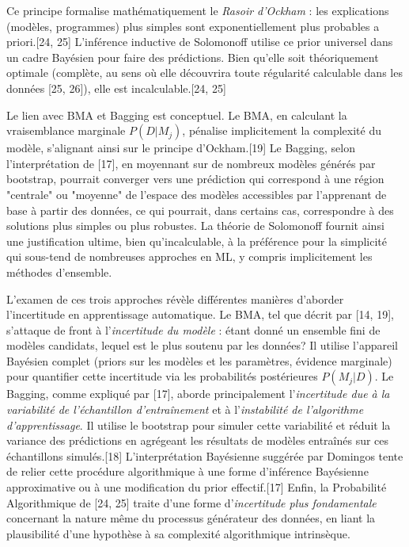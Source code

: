 \documentclass[11pt,a4paper]{article}
\begin{document}
Ce principe formalise mathématiquement le \textit{Rasoir d'Ockham} : les explications (modèles, programmes) plus simples sont exponentiellement plus probables a priori.[24, 25] L'inférence inductive de Solomonoff utilise ce prior universel dans un cadre Bayésien pour faire des prédictions. Bien qu'elle soit théoriquement optimale (complète, au sens où elle découvrira toute régularité calculable dans les données [25, 26]), elle est incalculable.[24, 25]

Le lien avec BMA et Bagging est conceptuel. Le BMA, en calculant la vraisemblance marginale $P(D|M_j)$, pénalise implicitement la complexité du modèle, s'alignant ainsi sur le principe d'Ockham.[19] Le Bagging, selon l'interprétation de \citet{Domingos1997} [17], en moyennant sur de nombreux modèles générés par bootstrap, pourrait converger vers une prédiction qui correspond à une région "centrale" ou "moyenne" de l'espace des modèles accessibles par l'apprenant de base à partir des données, ce qui pourrait, dans certains cas, correspondre à des solutions plus simples ou plus robustes. La théorie de Solomonoff fournit ainsi une justification ultime, bien qu'incalculable, à la préférence pour la simplicité qui sous-tend de nombreuses approches en ML, y compris implicitement les méthodes d'ensemble.

L'examen de ces trois approches révèle différentes manières d'aborder l'incertitude en apprentissage automatique. Le BMA, tel que décrit par \citet{Wasserman2000} [14, 19], s'attaque de front à l'\textit{incertitude du modèle} : étant donné un ensemble fini de modèles candidats, lequel est le plus soutenu par les données? Il utilise l'appareil Bayésien complet (priors sur les modèles et les paramètres, évidence marginale) pour quantifier cette incertitude via les probabilités postérieures $P(M_j|D)$. Le Bagging, comme expliqué par \citet{Domingos1997} [17], aborde principalement l'\textit{incertitude due à la variabilité de l'échantillon d'entraînement} et à l'\textit{instabilité de l'algorithme d'apprentissage}. Il utilise le bootstrap pour simuler cette variabilité et réduit la variance des prédictions en agrégeant les résultats de modèles entraînés sur ces échantillons simulés.[18] L'interprétation Bayésienne suggérée par Domingos tente de relier cette procédure algorithmique à une forme d'inférence Bayésienne approximative ou à une modification du prior effectif.[17] Enfin, la Probabilité Algorithmique de \citet{Solomonoff1964} [24, 25] traite d'une forme d'\textit{incertitude plus fondamentale} concernant la nature même du processus générateur des données, en liant la plausibilité d'une hypothèse à sa complexité algorithmique intrinsèque.
\end{document}
